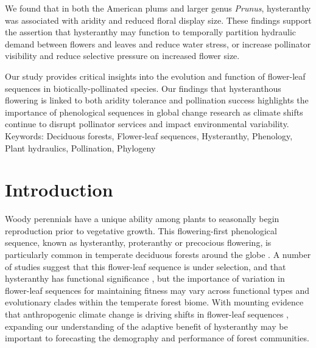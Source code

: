 \documentclass{article}[12pt]
\begin{document}
We found that in both the American plums and larger genus \emph{Prunus}, hysteranthy was associated with aridity and reduced floral display size. These findings support the assertion that hysteranthy may function to temporally partition hydraulic demand between flowers and leaves and reduce water stress, or increase pollinator visibility and reduce selective pressure on increased flower size.

Our study provides critical insights into the evolution and function of flower-leaf sequences in biotically-pollinated species.  %
Our findings that hysteranthous flowering is linked to both aridity tolerance and pollination success %
highlights the importance of  phenological sequences in global change research as climate shifts continue to disrupt pollinator services and impact environmental variability.\\

Keywords: Deciduous forests, Flower-leaf sequences, Hysteranthy, Phenology, Plant hydraulics, Pollination, Phylogeny

\pagebreak
\section*{Introduction}
\noindent Woody perennials have a unique ability among plants to seasonally begin reproduction prior to vegetative growth. This flowering-first phenological sequence, known as hysteranthy, proteranthy or precocious flowering, is particularly common in temperate deciduous forests around the globe \citep{Rathcke_1985}. A number of studies suggest that this flower-leaf sequence is under selection, and that hysteranthy has functional significance \citep{Gougherty2018,Buonaiuto2020,Guo2014}, but the importance of variation in flower-leaf sequences for maintaining fitness may vary across functional types and evolutionary clades within the temperate forest biome. With mounting evidence that anthropogenic climate change is driving shifts in flower-leaf sequences \citep{Ma:2021tf,Wang:2022wt}, expanding our understanding of the adaptive benefit of hysteranthy may be important to forecasting the demography and performance of forest communities.
\end{document}
